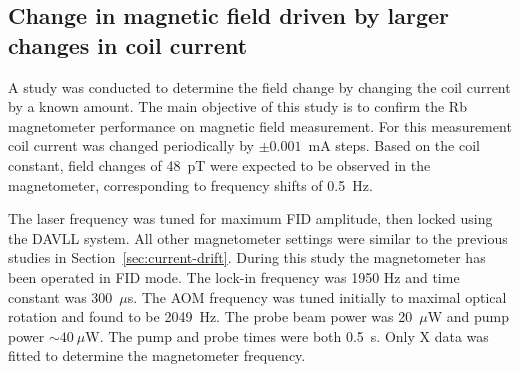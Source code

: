 %  



\subsection{Change in magnetic field driven by larger changes in coil current}

A study was conducted to determine the field change by changing the
coil current by a known amount. The main objective of this study is to
confirm the Rb magnetometer performance on magnetic field measurement.
For this measurement coil current was changed periodically by $\pm
0.001$~mA steps.  Based on the coil constant, field changes of 48~pT
were expected to be observed in the magnetometer, corresponding to
frequency shifts of 0.5~Hz.

The laser frequency was tuned for maximum FID amplitude, then locked
using the DAVLL system.  All other magnetometer settings were similar
to the previous studies in Section~\ref{sec:current-drift}.  During
this study the magnetometer has been operated in FID mode.  The
lock-in frequency was 1950 Hz and time constant was 300~$\mu$s.  The
AOM frequency was tuned initially to maximal optical rotation and
found to be 2049~Hz.  The probe beam power was 20~$\mu$W and pump
power $\sim 40~\mu$W.  The pump and probe times were both 0.5~s.  Only
X data was fitted to determine the magnetometer frequency.


